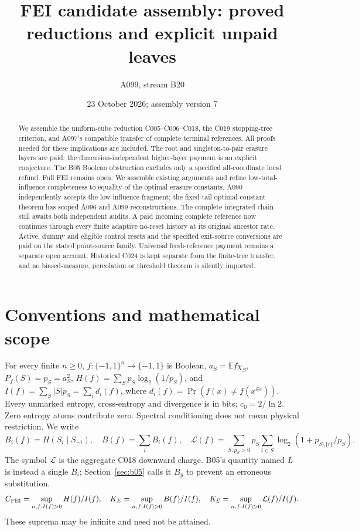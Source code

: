\documentclass[11pt]{article}
\title{FEI candidate assembly: proved reductions and explicit unpaid leaves}
\author{A099, stream B20}
\date{23 October 2026; assembly version 7}
\newcommand{\E}{\mathbb E}
\begin{document}
\maketitle
\begin{abstract}
We assemble the uniform-cube reduction C005--C006--C018, the
C019 stopping-tree criterion, and A097's compatible transfer of complete
terminal references. All proofs needed for these implications are included.
The root and singleton-to-pair erasure layers are paid; the
dimension-independent higher-layer payment is an explicit conjecture.
The B05 Boolean obstruction excludes only a specified all-coordinate local
refund. Full FEI remains open. We assemble existing arguments and refine
low-total-influence completeness to equality of the optimal erasure constants.
A090 independently accepts the low-influence fragment; the fixed-tail
optimal-constant theorem has scoped A096 and A099 reconstructions.
The complete integrated chain still awaits both independent audits.
A paid incoming complete reference now continues through every finite
adaptive no-reset history at its original ancestor rate. Active, dummy and eligible control resets and the specified exit-source
conversions are paid on the stated point-source family. Universal
fresh-reference payment remains a separate open account.
Historical C024 is kept separate from the
finite-tree transfer, and no biased-measure, percolation or threshold theorem
is silently imported.
\end{abstract}

\section{Conventions and mathematical scope}
For every finite $n\ge0$, $f:\{-1,1\}^n\to\{-1,1\}$ is Boolean,
$a_S=\E f\chi_S$, $P_f(S)=p_S=a_S^2$,
$H(f)=\sum_Sp_S\log_2(1/p_S)$, and
$I(f)=\sum_S|S|p_S=\sum_i d_i(f)$, where
$d_i(f)=\Pr(f(x)\ne f(x^{\oplus i}))$.
Every unmarked entropy, cross-entropy and divergence is in bits;
$c_0=2/\ln2$. Zero entropy atoms contribute zero. Spectral conditioning
does not mean physical restriction. We write
\[
 B_i(f)=H(S_i\mid S_{-i}),\quad B(f)=\sum_i B_i(f),\quad
 \mathcal L(f)=\sum_{S:p_S>0}p_S\sum_{i\in S}
                    \log_2(1+p_{S\setminus\{i\}}/p_S).
\]
The symbol $\mathcal L$ is the aggregate C018 downward charge. B05's
quantity named $L$ is instead a single $B_i$; Section~\ref{sec:b05}
calls it $B_y$ to prevent an erroneous substitution.
\[
C_{\rm FEI}=\sup_{n,f:I(f)>0} H(f)/I(f),\quad
K_E=\sup_{n,f:I(f)>0} B(f)/I(f),\quad
K_{\mathcal L}=\sup_{n,f:I(f)>0}\mathcal L(f)/I(f).
\]
These suprema may be infinite and need not be attained.
\end{document}

